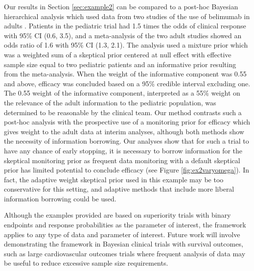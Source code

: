 \documentclass[AMA,STIX1COL,doublespace]{WileyNJD-v2}
\begin{document}
Our results in Section \ref{sec:example2} can be compared to a post-hoc Bayesian hierarchical analysis which used data from two studies of the use of belimumab in adults \citep{Brunner2020}. Patients in the pediatric trial had 1.5 times the odds of clinical response with 95\% CI (0.6, 3.5), and a meta-analysis of the two adult studies showed an odds ratio of 1.6 with 95\% CI (1.3, 2.1). The analysis used a mixture prior which was a weighted sum of a skeptical prior centered at null effect with effective sample size equal to two pediatric patients and an informative prior resulting from the meta-analysis. When the weight of the informative component was 0.55 and above, efficacy was concluded based on a 95\% credible interval excluding one. The 0.55 weight of the informative component, interpreted as a 55\% weight on the relevance of the adult information to the pediatric population, was determined to be reasonable by the clinical team. Our method contrasts such a post-hoc analysis with the prospective use of a monitoring prior for efficacy which gives weight to the adult data at interim analyses, although both methods show the necessity of information borrowing. Our analyses show that for such a trial to have any chance of early stopping, it is necessary to borrow information for the skeptical monitoring prior as frequent data monitoring with a default skeptical prior has limited potential to conclude efficacy (see Figure \ref{fig:ex2varyomega}). In fact, the adaptive weight skeptical prior used in this example may be too conservative for this setting, and adaptive methods that include more liberal information borrowing could be used.

Although the examples provided are based on superiority trials with binary endpoints and response probabilities as the parameter of interest, the framework applies to any type of data and parameter of interest.
%
Future work will involve demonstrating the framework in Bayesian clinical trials with survival outcomes, such as large cardiovascular outcomes trials where frequent analysis of data may be useful to reduce excessive sample size requirements.


\end{document}
